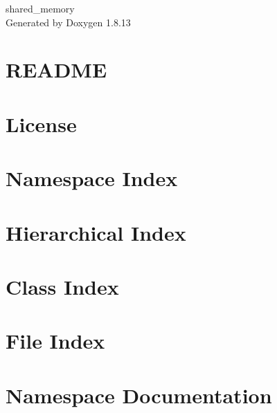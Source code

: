 \documentclass[twoside]{book}
\newcommand{\+}{\discretionary{\mbox{\scriptsize$\hookleftarrow$}}{}{}}
\newcommand{\clearemptydoublepage}{%
  \newpage{\pagestyle{empty}\cleardoublepage}%
}
\begin{document}
\hypersetup{pageanchor=false,
             bookmarksnumbered=true,
             pdfencoding=unicode
            }
\begin{titlepage}
\vspace*{7cm}
\begin{center}%
{\Large shared\+\_\+memory }\\
\vspace*{1cm}
{\large Generated by Doxygen 1.8.13}\\
\end{center}
\end{titlepage}
\clearemptydoublepage
{}
\tableofcontents
\clearemptydoublepage
{}
\hypersetup{pageanchor=true}

\chapter{R\+E\+A\+D\+ME}
\label{md_README}

\chapter{License}
\label{license}

\chapter{Namespace Index}

\chapter{Hierarchical Index}

\chapter{Class Index}

\chapter{File Index}

\chapter{Namespace Documentation}

\end{document}
